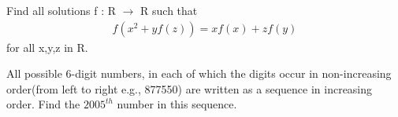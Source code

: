 \item Find all solutions f : R $\to$ R such that 
\begin{align*}
f(x^{2} + yf(z)) = xf(x) + zf(y)
\end{align*}
for all x,y,z in R. 

\item All possible 6-digit numbers, in each of which the digits occur in non-increasing order(from left to right e.g., 877550) are written as a sequence in increasing order. Find the $2005^{th}$ number in this sequence.
 






